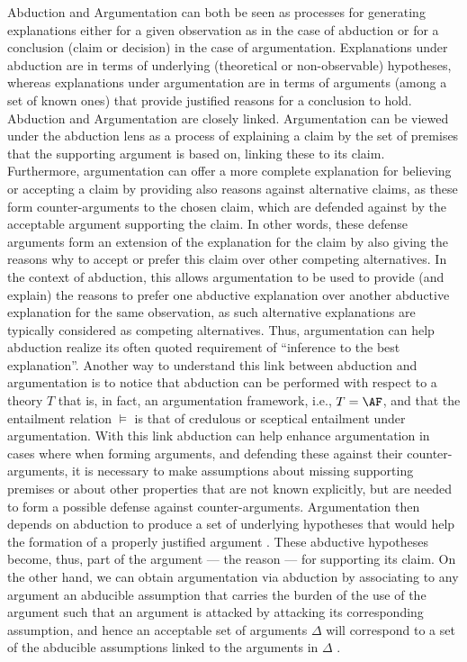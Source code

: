 Abduction and Argumentation can both be seen as processes for generating explanations either for a given observation as in the case of abduction or for a conclusion (claim or decision) in the case of argumentation. Explanations under abduction are in terms of underlying (theoretical or non-observable) hypotheses, whereas explanations under argumentation are in terms of arguments (among a set of known ones) that provide justified reasons for a conclusion to hold.
Abduction and Argumentation are closely linked. Argumentation can be viewed under the abduction lens as a process of explaining a claim by the set of premises that the supporting argument is based on, linking these to its claim. Furthermore, argumentation can offer a more complete explanation for believing or accepting a claim by providing also reasons against alternative claims, as these form counter-arguments to the chosen claim, which are defended against by the acceptable argument supporting the claim. In other words, these defense arguments form an extension of the explanation for the claim by also giving the reasons why to accept or prefer this claim over other competing alternatives. In the context of abduction, this allows argumentation to be used to provide (and explain) the reasons to prefer one abductive explanation over another abductive explanation for the same observation, as such alternative explanations are typically considered as competing alternatives. Thus, argumentation can help abduction realize its often quoted requirement of ``inference to the best explanation''.
Another way to understand this link between abduction and argumentation is to notice that abduction can be performed with respect to a theory $T$ that is, in fact, an argumentation framework, i.e., $T=\AF$, and that the entailment relation $\models$ is that of credulous or sceptical entailment under argumentation. With this link abduction can help enhance argumentation in cases where when forming arguments, and defending these against their counter-arguments, it is necessary to make assumptions about missing supporting premises or about other properties that are not known explicitly, but are needed to form a possible defense against counter-arguments. Argumentation then depends on abduction to produce a set of underlying hypotheses that would help the formation of a properly justified argument . These abductive hypotheses become, thus, part of the argument --- the reason --- for supporting its claim.
On the other hand, we can obtain argumentation via abduction by associating to any argument an abducible assumption that carries the burden of the use of the argument such that an argument is attacked by attacking its corresponding assumption, and hence an acceptable set of arguments $\Delta$ will correspond to a set of the abducible assumptions linked to the arguments in $\Delta$ .


